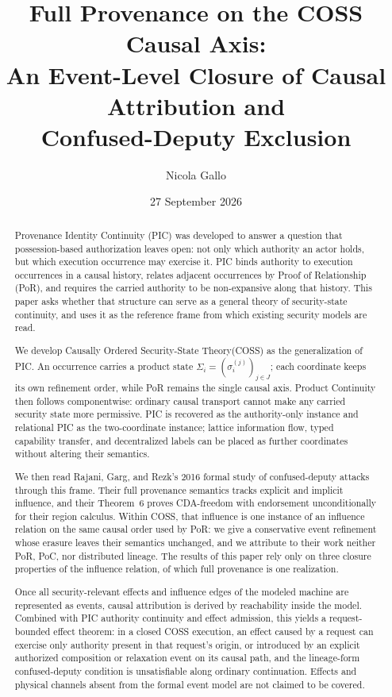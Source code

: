\documentclass[10pt,twocolumn]{article}
\title{Full Provenance on the COSS Causal Axis:\\
An Event-Level Closure of Causal Attribution and\\
Confused-Deputy Exclusion}
\author{Nicola Gallo}
\date{27 September 2026}
\newcommand{\Model}{\textnormal{\textsc{COSS}}\xspace}
\newcommand{\ModelFull}{Causally Ordered Security-State Theory\xspace}
\newcommand{\state}{\Sigma}
\newcommand{\coord}{\sigma}
\begin{document}
\maketitle

\begin{abstract}
Provenance Identity Continuity (PIC) was developed to answer a question that
possession-based authorization leaves open: not only which authority an actor
holds, but which execution occurrence may exercise it. PIC binds authority to
execution occurrences in a causal history, relates adjacent occurrences by
Proof of Relationship (PoR), and requires the carried authority to be
non-expansive along that history. This paper asks whether that structure can
serve as a general theory of security-state continuity, and uses it as the
reference frame from which existing security models are read.

We develop \ModelFull (\Model) as the generalization of PIC. An occurrence
carries a product state $\state_i=(\coord_i^{(j)})_{j\in J}$; each coordinate
keeps its own refinement order, while PoR remains the single causal axis.
Product Continuity then follows componentwise: ordinary causal transport
cannot make any carried security state more permissive. PIC is recovered as
the authority-only instance and relational PIC as the two-coordinate instance;
lattice information flow, typed capability transfer, and decentralized labels
can be placed as further coordinates without altering their semantics.

We then read Rajani, Garg, and Rezk's 2016 formal study of confused-deputy
attacks through this frame. Their full provenance semantics tracks explicit
and implicit influence, and their Theorem~6 proves CDA-freedom with endorsement
unconditionally for their region calculus. Within \Model, that influence is one
instance of an influence relation on the same causal order used by PoR: we give
a conservative event refinement whose erasure leaves their semantics
unchanged, and we attribute to their work neither PoR, PoC, nor distributed
lineage. The results of this paper rely only on three closure properties of the
influence relation, of which full provenance is one realization.

Once all security-relevant effects and influence edges of the modeled machine
are represented as events, causal attribution is derived by reachability
inside the model. Combined with PIC authority continuity and effect admission,
this yields a request-bounded effect theorem: in a closed \Model execution,
an effect caused by a request can exercise only authority present in that
request's origin, or introduced by an explicit authorized composition or
relaxation event on its causal path, and the lineage-form confused-deputy
condition is unsatisfiable along ordinary continuation. Effects and physical
channels absent from the formal event model are not claimed to be covered.
\end{abstract}
\end{document}
